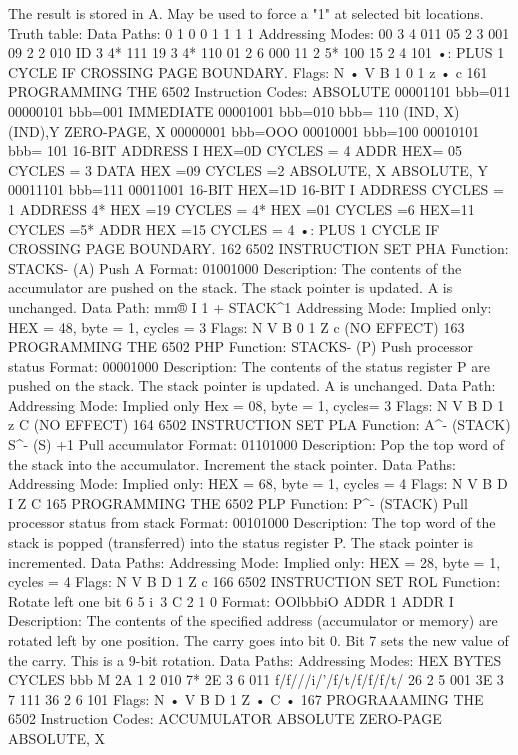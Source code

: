 \documentclass{book}
\begin{document}
The result is stored in A. May be used to force a "1" at selected bit
locations.
Truth table:
Data Paths:
0
1
0
0
1
1
1
1
Addressing Modes:
00
3
4
011
05
2
3
001
09
2
2
010
ID
3
4*
111
19
3
4*
110
01
2
6
000
11
2
5*
100
15
2
4
101
•: PLUS 1 CYCLE IF CROSSING PAGE BOUNDARY.
Flags:
N
•
V B
1
0 1 z
•
c
161
PROGRAMMING THE 6502
Instruction Codes:
ABSOLUTE 00001101
bbb=011
00000101
bbb=001
IMMEDIATE 00001001
bbb=010
bbb= 110
(IND, X)
(IND),Y
ZERO-PAGE, X
00000001
bbb=OOO
00010001
bbb=100
00010101
bbb= 101
16-BIT ADDRESS
I
HEX=0D CYCLES = 4
ADDR
HEX= 05 CYCLES = 3
DATA
HEX =09 CYCLES =2
ABSOLUTE, X
ABSOLUTE, Y
00011101
bbb=111
00011001
16-BIT
HEX=1D
16-BIT
I
ADDRESS
CYCLES =
1
ADDRESS
4*
HEX =19 CYCLES = 4*
HEX =01 CYCLES =6
HEX=11 CYCLES =5*
ADDR
HEX =15 CYCLES = 4
•: PLUS 1 CYCLE IF CROSSING PAGE BOUNDARY.
162
6502 INSTRUCTION SET
PHA
Function:
STACKS- (A)
Push A
Format: 01001000
Description:
The contents of the accumulator are pushed on the stack. The
stack pointer is updated. A is unchanged.
Data Path:
mm®
I
1
+
STACK^1
Addressing Mode:
Implied only:
HEX = 48, byte = 1, cycles = 3
Flags:
N V B 0 1 Z c
(NO EFFECT)
163
PROGRAMMING THE 6502
PHP
Function:
STACKS- (P)
Push processor status
Format: 00001000
Description:
The contents of the status register P are pushed on the stack.
The stack pointer is updated. A is unchanged.
Data Path:
Addressing Mode:
Implied only
Hex = 08, byte = 1, cycles= 3
Flags:
N V B D 1 z C
(NO EFFECT)
164
6502 INSTRUCTION SET
PLA
Function:
A^- (STACK)
S^- (S) +1
Pull accumulator
Format: 01101000
Description:
Pop the top word of the stack into the accumulator. Increment
the stack pointer.
Data Paths:
Addressing Mode:
Implied only:
HEX = 68, byte = 1, cycles = 4
Flags:
N V B D I Z C
165
PROGRAMMING THE 6502
PLP
Function:
P^- (STACK)
Pull processor status from stack
Format: 00101000
Description:
The top word of the stack is popped (transferred) into the status
register P. The stack pointer is incremented.
Data Paths:
Addressing Mode:
Implied only:
HEX = 28, byte = 1, cycles = 4
Flags:
N V B D 1 Z c
166
6502 INSTRUCTION SET
ROL
Function:
Rotate left one bit
6 5 i\ 3
C
2 1 0
Format: OOlbbbiO ADDR
1
ADDR I
Description:
The contents of the specified address (accumulator or memory)
are rotated left by one position. The carry goes into bit 0. Bit 7
sets the new value of the carry. This is a 9-bit rotation.
Data Paths:
Addressing Modes:
HEX
BYTES
CYCLES
bbb
M
2A
1
2
010
7*
2E
3
6
011
f/f///i/'/f/t/f/f/f/t/
26
2
5
001
3E
3
7
111
36
2
6
101
Flags:
N
•
V B D 1 Z
•
C
•
167
PROGRAAAMING THE 6502
Instruction Codes:
ACCUMULATOR
ABSOLUTE
ZERO-PAGE
ABSOLUTE, X
\end{document}
